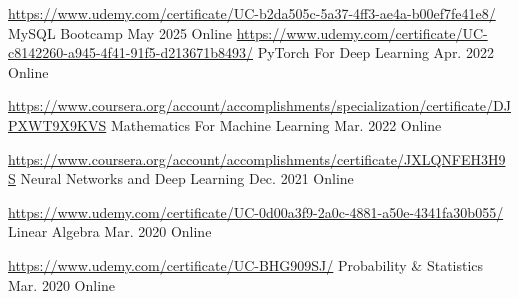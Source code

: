 

\begin{cventries}

  \cventry 
    {\url{https://www.udemy.com/certificate/UC-b2da505c-5a37-4ff3-ae4a-b00ef7fe41e8/}} %
    {MySQL Bootcamp} %
    {May 2025} %
    {Online} %
    {}
  \cventry 
    {\url{https://www.udemy.com/certificate/UC-c8142260-a945-4f41-91f5-d213671b8493/}} %
    {PyTorch For Deep Learning} %
    {Apr. 2022} %
    {Online} %
    {}

  \cventry 
    {\url{https://www.coursera.org/account/accomplishments/specialization/certificate/DJPXWT9X9KVS}} %
    {Mathematics For Machine Learning} %
    {Mar. 2022} %
    {Online} %
    {}

  \cventry 
    {\url{https://www.coursera.org/account/accomplishments/certificate/JXLQNFEH3H9S}} %
    {Neural Networks and Deep Learning} %
    {Dec. 2021} %
    {Online} %
    {}

  \cventry 
    {\url{https://www.udemy.com/certificate/UC-0d00a3f9-2a0c-4881-a50e-4341fa30b055/}} %
    {Linear Algebra} %
    {Mar. 2020} %
    {Online} %
    {}

  \cventry 
    {\url{https://www.udemy.com/certificate/UC-BHG909SJ/}} %
    {Probability \& Statistics} %
    {Mar. 2020} %
    {Online} %
    {}
\end{cventries}

